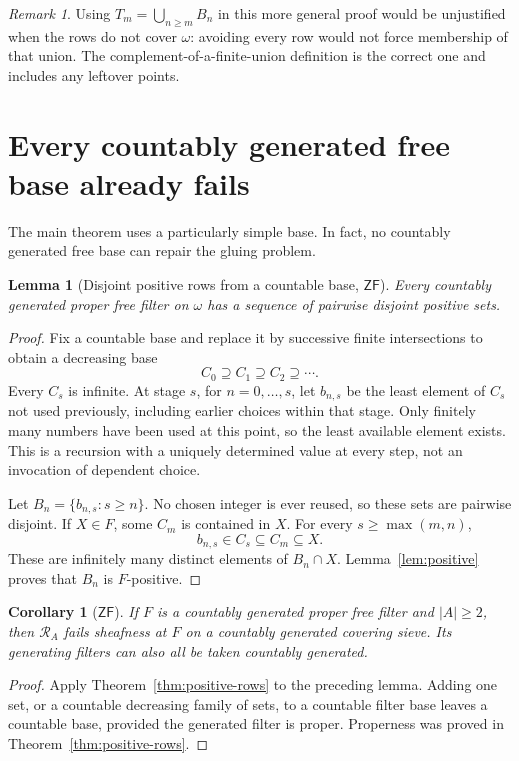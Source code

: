 \documentclass[11pt,letterpaper]{article}
\newtheorem{lemma}[theorem]{Lemma}
\newtheorem{corollary}[theorem]{Corollary}
\theoremstyle{definition}
\theoremstyle{remark}
\newtheorem{remark}[theorem]{Remark}
\newcommand{\om}{\omega}
\newcommand{\RA}{\mathscr R_A}
\newcommand{\ZF}{\mathsf{ZF}}
\begin{document}
\begin{remark}
Using $T_m=\bigcup_{n\geq m}B_n$ in this more general proof would be
unjustified when the rows do not cover $\om$: avoiding every row would
not force membership of that union. The complement-of-a-finite-union
definition is the correct one and includes any leftover points.
\end{remark}

\section{Every countably generated free base already fails}
\label{sec:countablebase}

The main theorem uses a particularly simple base. In fact, no countably
generated free base can repair the gluing problem.

\begin{lemma}[Disjoint positive rows from a countable base, $\ZF$]
\label{lem:countable-rows}
Every countably generated proper free filter on $\om$ has a sequence
of pairwise disjoint positive sets.
\end{lemma}
\begin{proof}
Fix a countable base and replace it by successive finite intersections
to obtain a decreasing base
\[
 C_0\supseteq C_1\supseteq C_2\supseteq\cdots.
\]
Every $C_s$ is infinite. At stage $s$, for $n=0,\ldots,s$, let
$b_{n,s}$ be the least element of $C_s$ not used previously, including
earlier choices within that stage. Only finitely many numbers have
been used at this point, so the least available element exists.
This is a recursion with a uniquely determined value at every step,
not an invocation of dependent choice.

Let $B_n=\{b_{n,s}:s\geq n\}$. No chosen integer is ever reused,
so these sets are pairwise disjoint. If $X\in F$, some $C_m$ is
contained in $X$. For every $s\geq\max(m,n)$,
\[
 b_{n,s}\in C_s\subseteq C_m\subseteq X.
\]
These are infinitely many distinct elements of $B_n\cap X$.
Lemma~\ref{lem:positive} proves that $B_n$ is $F$-positive.
\end{proof}

\begin{corollary}[$\ZF$]\label{cor:countablebase}
If $F$ is a countably generated proper free filter and $|A|\geq2$,
then $\RA$ fails sheafness at $F$ on a countably generated covering
sieve. Its generating filters can also all be taken countably generated.
\end{corollary}
\begin{proof}
Apply Theorem~\ref{thm:positive-rows} to the preceding lemma. Adding
one set, or a countable decreasing family of sets, to a countable filter
base leaves a countable base, provided the generated filter is proper.
Properness was proved in Theorem~\ref{thm:positive-rows}.
\end{proof}
\end{document}
